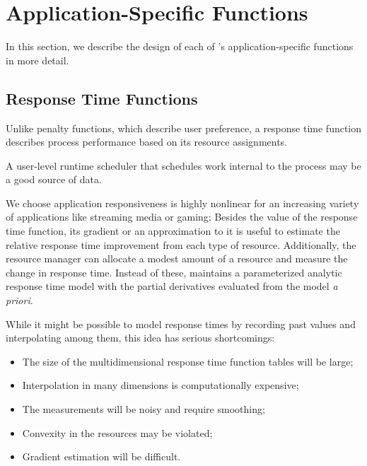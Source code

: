 \section{Application-Specific Functions}\label{app_func}


In this section, we describe the design of each of \pacora's application-specific functions in more detail.

\subsection*{Response Time Functions}

Unlike penalty functions, which describe user preference, a response time function describes process performance based on its resource assignments.

A user-level runtime scheduler that schedules work internal to the process may be a good source of data.

We choose application responsiveness is highly nonlinear for an increasing variety of applications like streaming media or gaming; 
Besides the value of the response time function, its gradient or an approximation to it is useful to estimate the relative response time improvement from each type of resource. 
Additionally, the resource manager can allocate a modest amount of a resource and measure the change in response time.
Instead of these, \pacora maintains a parameterized analytic response time model with the partial derivatives evaluated from the model \emph{a priori}.

While it might be possible to model response times by recording past values and interpolating among them,
this idea has serious shortcomings:
\begin{itemize}
\item The size of the multidimensional response time function tables will be large;
\item Interpolation in many dimensions is computationally expensive;
\item The measurements will be noisy and require smoothing;
\item Convexity in the resources may be violated;
\item Gradient estimation will be difficult.
\end{itemize}


